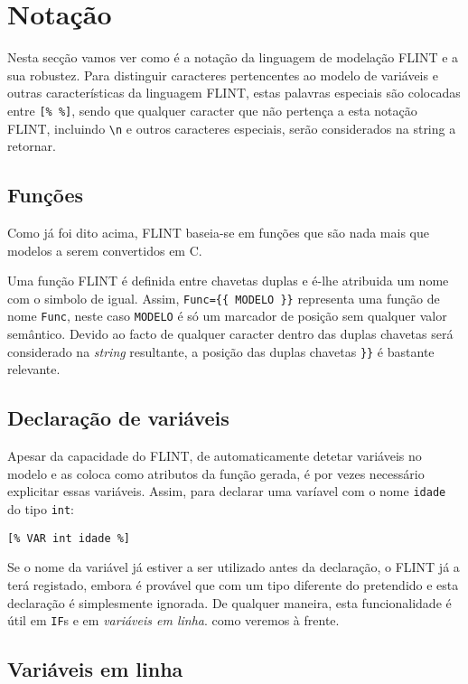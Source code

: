 \section{Notação}

Nesta secção vamos ver como é a notação da linguagem de modelação FLINT e a sua robustez. Para distinguir caracteres pertencentes ao modelo de variáveis e outras características da linguagem FLINT, estas palavras especiais são colocadas entre \texttt{[\% \%]}, sendo que qualquer caracter que não pertença a esta notação FLINT, incluindo \texttt{\textbackslash n} e outros caracteres especiais, serão considerados na string a retornar.

\subsection{Funções}
Como já foi dito acima, FLINT baseia-se em funções que são nada mais que modelos a serem convertidos em C.

Uma função FLINT é definida entre chavetas duplas e é-lhe atribuida um nome com o simbolo de igual. Assim, \texttt{Func=\{\{ MODELO \}\}} representa uma função de nome \texttt{Func}, neste caso \texttt{MODELO} é só um marcador de posição sem qualquer valor semântico. Devido ao facto de qualquer caracter dentro das duplas chavetas será considerado na \emph{string} resultante, a posição das duplas chavetas \texttt{\}\}} é bastante relevante. 

\subsection{Declaração de variáveis}
Apesar da capacidade do FLINT, de automaticamente detetar variáveis no modelo e as coloca como atributos da função gerada, é por vezes necessário explicitar essas variáveis. Assim, para declarar uma varíavel com o nome \texttt{idade} do tipo \texttt{int}:
\begin{lstlisting}
[% VAR int idade %]
\end{lstlisting}
Se o nome da variável já estiver a ser utilizado antes da declaração, o FLINT já a terá registado, embora é provável que com um tipo diferente do pretendido e esta declaração é simplesmente ignorada. De qualquer maneira, esta funcionalidade é útil em \texttt{IF}s e em \emph{variáveis em linha}. como veremos à frente.

\subsection{Variáveis em linha}

